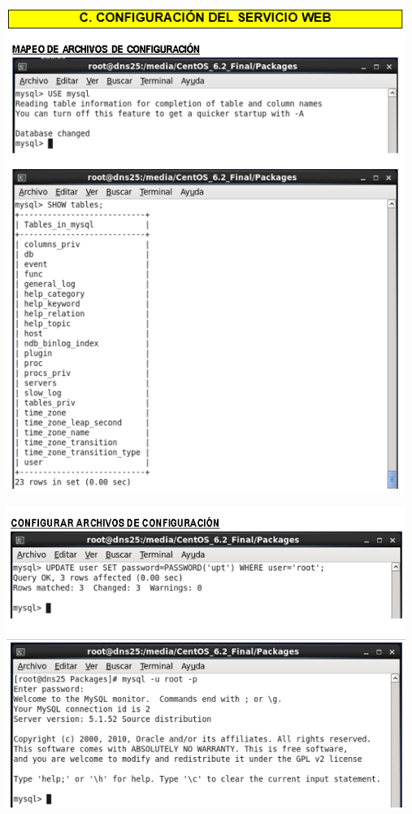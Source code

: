 \begin{itemize}
	\begin{center}
		\includegraphics[width=13cm]{./Imagenes/9a}
		\end{center}
\end{itemize} 

\begin{itemize}
	\begin{center}
		\includegraphics[width=13cm]{./Imagenes/10a}
		\end{center}
\end{itemize} 

